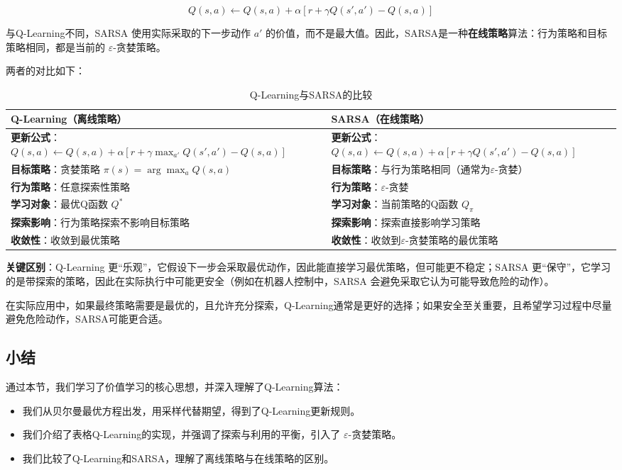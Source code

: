 \documentclass[lang=cn,zihao=-4,a4paper,fontset=windows]{beautybook}
\begin{document}
\[
Q(s,a) \leftarrow Q(s,a) + \alpha [r + \gamma Q(s',a') - Q(s,a)]
\]

与Q-Learning不同，SARSA 使用实际采取的下一步动作 \(a'\) 的价值，而不是最大值。因此，SARSA是一种\textbf{在线策略}算法：行为策略和目标策略相同，都是当前的 \(\varepsilon\)-贪婪策略。

两者的对比如下：

\begin{table}[h]
\centering
\caption{Q-Learning与SARSA的比较}
\begin{tabular}{p{}p{}}
\toprule
\textbf{Q-Learning（离线策略）} & \textbf{SARSA（在线策略）} \\
\midrule
\textbf{更新公式}：$Q(s,a) \leftarrow Q(s,a) + \alpha[r + \gamma \max_{a'} Q(s',a') - Q(s,a)]$ & \textbf{更新公式}：$Q(s,a) \leftarrow Q(s,a) + \alpha[r + \gamma Q(s',a') - Q(s,a)]$ \\
\hline
\textbf{目标策略}：贪婪策略 $\pi(s) = \arg\max_{a} Q(s,a)$ & \textbf{目标策略}：与行为策略相同（通常为$\varepsilon$-贪婪） \\
\hline
\textbf{行为策略}：任意探索性策略 & \textbf{行为策略}：$\varepsilon$-贪婪 \\
\hline
\textbf{学习对象}：最优Q函数 $Q^*$ & \textbf{学习对象}：当前策略的Q函数 $Q_\pi$ \\
\hline
\textbf{探索影响}：行为策略探索不影响目标策略 & \textbf{探索影响}：探索直接影响学习策略 \\
\hline
\textbf{收敛性}：收敛到最优策略 & \textbf{收敛性}：收敛到$\varepsilon$-贪婪策略的最优策略 \\
\bottomrule
\end{tabular}
\end{table}

\textbf{关键区别}：Q-Learning 更“乐观”，它假设下一步会采取最优动作，因此能直接学习最优策略，但可能更不稳定；SARSA 更“保守”，它学习的是带探索的策略，因此在实际执行中可能更安全（例如在机器人控制中，SARSA 会避免采取它认为可能导致危险的动作）。

在实际应用中，如果最终策略需要是最优的，且允许充分探索，Q-Learning通常是更好的选择；如果安全至关重要，且希望学习过程中尽量避免危险动作，SARSA可能更合适。

\subsection{小结}

通过本节，我们学习了价值学习的核心思想，并深入理解了Q-Learning算法：
\begin{itemize}
    \item 我们从贝尔曼最优方程出发，用采样代替期望，得到了Q-Learning更新规则。
    \item 我们介绍了表格Q-Learning的实现，并强调了探索与利用的平衡，引入了 \(\varepsilon\)-贪婪策略。
    \item 我们比较了Q-Learning和SARSA，理解了离线策略与在线策略的区别。
\end{itemize}
\end{document}
